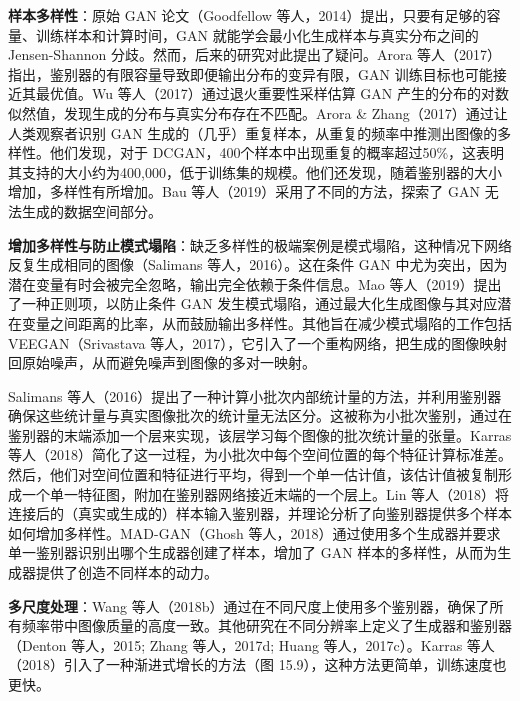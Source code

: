 \documentclass[lang=cn,newtx,10pt,scheme=chinese]{elegantbook}
\begin{document}
\textbf{样本多样性}：原始 GAN 论文（Goodfellow 等人，2014）提出，只要有足够的容量、训练样本和计算时间，GAN 就能学会最小化生成样本与真实分布之间的 Jensen-Shannon 分歧。然而，后来的研究对此提出了疑问。Arora 等人（2017）指出，鉴别器的有限容量导致即便输出分布的变异有限，GAN 训练目标也可能接近其最优值。Wu 等人（2017）通过退火重要性采样估算 GAN 产生的分布的对数似然值，发现生成的分布与真实分布存在不匹配。Arora \& Zhang（2017）通过让人类观察者识别 GAN 生成的（几乎）重复样本，从重复的频率中推测出图像的多样性。他们发现，对于 DCGAN，400个样本中出现重复的概率超过50\%，这表明其支持的大小约为400,000，低于训练集的规模。他们还发现，随着鉴别器的大小增加，多样性有所增加。Bau 等人（2019）采用了不同的方法，探索了 GAN 无法生成的数据空间部分。

\textbf{增加多样性与防止模式塌陷}：缺乏多样性的极端案例是模式塌陷，这种情况下网络反复生成相同的图像（Salimans 等人，2016）。这在条件 GAN 中尤为突出，因为潜在变量有时会被完全忽略，输出完全依赖于条件信息。Mao 等人（2019）提出了一种正则项，以防止条件 GAN 发生模式塌陷，通过最大化生成图像与其对应潜在变量之间距离的比率，从而鼓励输出多样性。其他旨在减少模式塌陷的工作包括 VEEGAN（Srivastava 等人，2017），它引入了一个重构网络，把生成的图像映射回原始噪声，从而避免噪声到图像的多对一映射。

Salimans 等人（2016）提出了一种计算小批次内部统计量的方法，并利用鉴别器确保这些统计量与真实图像批次的统计量无法区分。这被称为小批次鉴别，通过在鉴别器的末端添加一个层来实现，该层学习每个图像的批次统计量的张量。Karras 等人（2018）简化了这一过程，为小批次中每个空间位置的每个特征计算标准差。然后，他们对空间位置和特征进行平均，得到一个单一估计值，该估计值被复制形成一个单一特征图，附加在鉴别器网络接近末端的一个层上。Lin 等人（2018）将连接后的（真实或生成的）样本输入鉴别器，并理论分析了向鉴别器提供多个样本如何增加多样性。MAD-GAN（Ghosh 等人，2018）通过使用多个生成器并要求单一鉴别器识别出哪个生成器创建了样本，增加了 GAN 样本的多样性，从而为生成器提供了创造不同样本的动力。

\textbf{多尺度处理}：Wang 等人（2018b）通过在不同尺度上使用多个鉴别器，确保了所有频率带中图像质量的高度一致。其他研究在不同分辨率上定义了生成器和鉴别器（Denton 等人，2015; Zhang 等人，2017d; Huang 等人，2017c）。Karras 等人（2018）引入了一种渐进式增长的方法（图 15.9），这种方法更简单，训练速度也更快。
\end{document}
